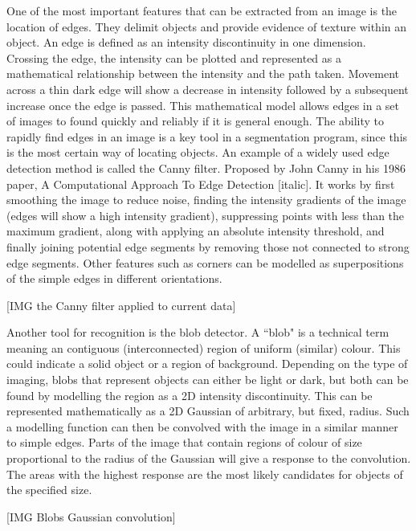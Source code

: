 One of the most important features that can be extracted from an image is the location of edges. They delimit objects and provide evidence of texture within an object. An edge is defined as an intensity discontinuity in one dimension. Crossing the edge, the intensity can be plotted and represented as a mathematical relationship between the intensity and the path taken. Movement across a thin dark edge will show a decrease in intensity followed by a subsequent increase once the edge is passed. This mathematical model allows edges in a set of images to found quickly and reliably if it is general enough. The ability to rapidly find edges in an image is a key tool in a segmentation program, since this is the most certain way of locating objects. An example of a widely used edge detection method is called the Canny filter. Proposed by John Canny in his 1986 paper, A Computational Approach To Edge Detection [italic]. It works by first smoothing the image to reduce noise, finding the intensity gradients of the image (edges will show a high intensity gradient), suppressing points with less than the maximum gradient, along with applying an absolute intensity threshold, and finally joining potential edge segments by removing those not connected to strong edge segments. Other features such as corners can be modelled as superpositions of the simple edges in different orientations.

[IMG the Canny filter applied to current data]

Another tool for recognition is the blob detector. A ``blob" is a technical term meaning an contiguous (interconnected) region of uniform (similar) colour. This could indicate a solid object or a region of background. Depending on the type of imaging, blobs that represent objects can either be light or dark, but both can be found by modelling the region as a 2D intensity discontinuity. This can be represented mathematically as a 2D Gaussian of arbitrary, but fixed, radius. Such a modelling function can then be convolved with the image in a similar manner to simple edges. Parts of the image that contain regions of colour of size proportional to the radius of the Gaussian will give a response to the convolution. The areas with the highest response are the most likely candidates for objects of the specified size.

[IMG Blobs Gaussian convolution]

